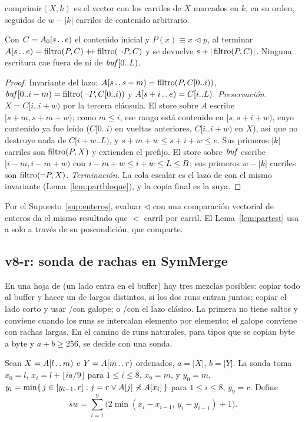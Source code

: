 \noindent $\mathrm{comprimir}(X,k)$ es el vector con los carriles de $X$ marcados en $k$,
en su orden, seguidos de $w-|k|$ carriles de contenido arbitrario.

\begin{lema}\label{lem:partvec}
Con $C=A_0[s\mathinner{.\,.}e)$ el contenido inicial y $P(x)\equiv x\triangleleft p$, al terminar
$A[s\mathinner{.\,.}e)=\operatorname{filtro}(P,C)\mathbin{+\!\!+}\operatorname{filtro}(\neg P,C)$ y se devuelve $s+|\operatorname{filtro}(P,C)|$. Ninguna
escritura cae fuera de  ni de $\mathit{buf}[0..L)$.
\end{lema}
\begin{proof}
Invariante del lazo: $A[s\mathinner{.\,.}s+m)=\operatorname{filtro}(P,C[0..i))$,
$\mathit{buf}[0..i-m)=\operatorname{filtro}(\neg P,C[0..i))$ y $A[s+i\mathinner{.\,.}e)=C[i..L)$.
\emph{Preservación.} $X=C[i..i+w)$ por la tercera cláusula. El store sobre $A$ escribe
$[s+m,s+m+w)$; como $m\le i$, ese rango está contenido en $[s,s+i+w)$, cuyo contenido
ya fue leído ($C[0..i)$ en vueltas anteriores, $C[i..i+w)$ en $X$), así que no destruye
nada de $C[i+w..L)$, y $s+m+w\le s+i+w\le e$. Sus primeros $|k|$ carriles son
$\operatorname{filtro}(P,X)$ y extienden el prefijo. El store sobre $\mathit{buf}$ escribe
$[i-m,i-m+w)$ con $i-m+w\le i+w\le L\le B$; sus primeros $w-|k|$ carriles son
$\operatorname{filtro}(\neg P,X)$. \emph{Terminación.} La cola escalar es el lazo de
\PartBloque con el mismo invariante (Lema~\ref{lem:partbloque}), y la copia final es
la suya.
\end{proof}

Por el Supuesto~\ref{sup:enteros}, evaluar $\triangleleft$ con una comparación vectorial
de enteros da el mismo resultado que $\lt$ carril por carril. El
Lema~\ref{lem:partest} usa a \PartBloque solo a través de su poscondición, que
\PartVec comparte.

\subsection{v8-r: sonda de rachas en SymMerge}\label{sec:sonda}
En una hoja de \SymMerge (un lado entra en el buffer) hay tres mezclas posibles: copiar
todo al buffer y hacer un \Parity de largos distintos, si los dos runs entran juntos;
copiar el lado corto y usar \MIzq/\MDer con galope; o \MIzq/\MDer con el lazo
clásico. La primera no tiene saltos y conviene cuando los runs se intercalan elemento
por elemento; el galope conviene con rachas largas. En el camino de runs naturales,
para tipos que se copian byte a byte y $a+b\ge256$, se decide con una sonda.

Sean $X=A[l\mathinner{.\,.}m)$ e $Y=A[m\mathinner{.\,.}r)$ ordenados, $a=|X|$, $b=|Y|$. La sonda toma
$x_0=l$, $x_i=l+\lfloor ia/9\rfloor$ para $1\le i\le 8$, $x_9=m$, y
$y_0=m$, $y_i=\min\{\,j\in[y_{i-1},r] : j=r \vee A[j]\not\prec A[x_i]\,\}$ para $1\le i\le8$,
$y_9=r$. Define
\[\mathit{sw}=\sum_{i=1}^{9}\bigl(2\min(x_i-x_{i-1},\,y_i-y_{i-1})+1\bigr).\]

